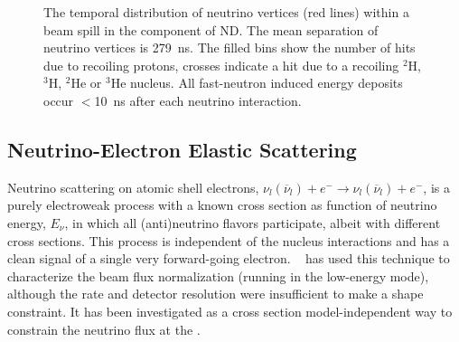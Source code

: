 \begin{figure}[htb]
	\caption{The temporal distribution of neutrino vertices (red lines) within a beam spill in the  component of  ND.
		The mean separation of neutrino vertices is \SI{279}{\nano\second}. The filled bins show the number of hits due to recoiling protons, crosses indicate a hit due to a recoiling $^{2}$H, $^3$H, $^2$He or $^3$He nucleus.
		All fast-neutron induced energy deposits occur $<$\SI{10}{\nano\second} after each neutrino interaction.}
	\label{fig:Timing}
\end{figure}

	
\subsection{Neutrino-Electron Elastic Scattering}
\label{ssec:lartpc-nu-electron-scatt}

Neutrino scattering on atomic shell electrons, $\nu_{l}(\overline{\nu}_{l}) + e^{-} \rightarrow \nu_{l}(\overline{\nu}_{l}) + e^{-}$,
is a purely electroweak process with a known cross section as function of neutrino energy, $E_{\nu}$, in which all (anti)neutrino flavors participate, albeit with different cross sections. This process is independent of the nucleus interactions and has a clean signal of a single very forward-going electron. ~\cite{Park:2015eqa} has used this technique to characterize the  beam flux normalization (running in the  low-energy mode), although the rate and detector resolution were insufficient to make a shape constraint. It has been investigated as a cross section model-independent way to constrain the neutrino flux at the   .

